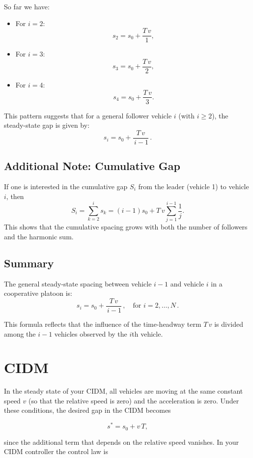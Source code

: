 \documentclass{article}
\begin{document}
So far we have:
\begin{itemize}
    \item For \(i=2\):  
    \[
    s_2 = s_0 + \frac{T\,v}{1},
    \]
    \item For \(i=3\):  
    \[
    s_3 = s_0 + \frac{T\,v}{2},
    \]
    \item For \(i=4\):  
    \[
    s_4 = s_0 + \frac{T\,v}{3}.
    \]
\end{itemize}

This pattern suggests that for a general follower vehicle \( i \) (with \( i \ge 2 \)), the steady-state gap is given by:
\[
\boxed{s_i = s_0 + \frac{T\,v}{\,i-1}\,.}
\]

\subsection*{Additional Note: Cumulative Gap}

If one is interested in the cumulative gap \( S_i \) from the leader (vehicle 1) to vehicle \( i \), then
\[
S_i = \sum_{k=2}^{i} s_k = (i-1)s_0 + T\,v \sum_{j=1}^{i-1} \frac{1}{j}.
\]
This shows that the cumulative spacing grows with both the number of followers and the harmonic sum.

\subsection*{Summary}

The general steady-state spacing between vehicle \( i-1 \) and vehicle \( i \) in a cooperative platoon is:
\[
\boxed{s_i = s_0 + \frac{T\,v}{\,i-1}\,,\quad \text{for } i=2,\ldots,N\,.}
\]

This formula reflects that the influence of the time-headway term \( T\,v \) is divided among the \( i-1 \) vehicles observed by the \( i \)th vehicle.

\section{CIDM}

In the steady state of your CIDM, all vehicles are moving at the same constant speed \(v\) (so that the relative speed is zero) and the acceleration is zero. Under these conditions, the desired gap in the CIDM becomes

\[
s^* = s_0 + v\,T,
\]

since the additional term that depends on the relative speed vanishes. In your CIDM controller the control law is
\end{document}
